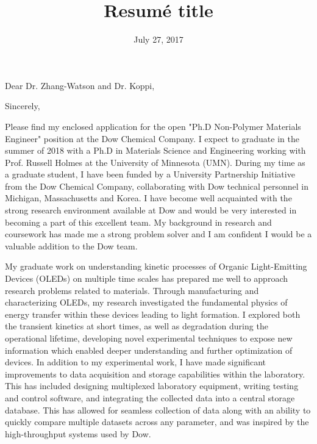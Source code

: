 \documentclass[11pt,a4paper,roman]{moderncv}        %
\title{Resumé title}                               %
\begin{document}
\date{July 27, 2017}
\opening{Dear Dr. Zhang-Watson and Dr. Koppi,}
\closing{Sincerely,}
\makelettertitle
\justify
Please find my enclosed application for the open "Ph.D Non-Polymer Materials Engineer" position at the Dow Chemical Company.  I expect to graduate in the summer of 2018 with a  Ph.D in Materials Science and Engineering working with Prof. Russell Holmes at the University of Minnesota (UMN).  During my time as a graduate student, I have been funded by a University Partnership Initiative from the Dow Chemical Company, collaborating with Dow technical personnel  in Michigan, Massachusetts and Korea.  I have become well acquainted with the strong research environment available at Dow and would be very interested in becoming a part of this excellent team.  My background in research and coursework has made me a strong problem solver and I am confident I would be a valuable addition to the Dow team.

My graduate work on understanding kinetic processes of Organic Light-Emitting Devices (OLEDs) on multiple time scales has prepared me well to approach research problems related to materials.  Through manufacturing and characterizing OLEDs, my research investigated the fundamental physics of energy transfer within these devices leading to light formation.  I explored both the transient kinetics at short times, as well as degradation during the operational lifetime, developing novel experimental techniques to expose new information which enabled deeper understanding and further optimization of devices. In addition to my experimental work, I have made significant improvements to data acquisition and storage capabilities within the laboratory.  This has included designing multiplexed laboratory equipment, writing testing and control software, and integrating the collected data into a central storage database.  This has allowed for seamless collection of data along with an ability to quickly compare multiple datasets across any parameter, and was inspired by the high-throughput systems used by Dow.  
\end{document}
